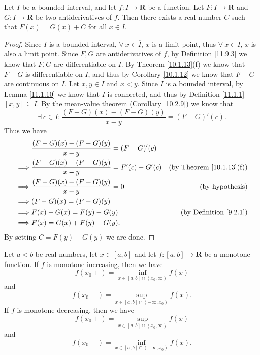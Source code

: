 \begin{lemma}\label{11.9.5}
    Let \(I\) be a bounded interval, and let \(f : I \to \mathbf{R}\) be a function.
    Let \(F : I \to \mathbf{R}\) and \(G : I \to \mathbf{R}\) be two antiderivatives of \(f\).
    Then there exists a real number \(C\) such that \(F(x) = G(x) + C\) for all \(x \in I\).
\end{lemma}

\begin{proof}
    Since \(I\) is a bounded interval, \(\forall\ x \in \overline{I}\), \(x\) is a limit point, thus \(\forall\ x \in I\), \(x\) is also a limit point.
    Since \(F, G\) are antiderivatives of \(f\), by Definition \ref{11.9.3} we know that \(F, G\) are differentiable on \(I\).
    By Theorem \ref{10.1.13}(f) we know that \(F - G\) is differentiable on \(I\), and thus by Corollary \ref{10.1.12} we know that \(F - G\) are continuous on \(I\).
    Let \(x, y \in I\) and \(x < y\).
    Since \(I\) is a bounded interval, by Lemma \ref{11.1.10} we know that \(I\) is connected, and thus by Definition \ref{11.1.1} \([x, y] \subseteq I\).
    By the mean-value theorem (Corollary \ref{10.2.9}) we know that
    \[
        \exists\ c \in I : \frac{(F - G)(x) - (F - G)(y)}{x - y} = (F - G)'(c).
    \]
    Thus we have
    \begin{align*}
                 & \frac{(F - G)(x) - (F - G)(y)}{x - y} = (F - G)'(c)                                          \\
        \implies & \frac{(F - G)(x) - (F - G)(y)}{x - y} = F'(c) - G'(c) & \text{(by Theorem \ref{10.1.13}(f))} \\
        \implies & \frac{(F - G)(x) - (F - G)(y)}{x - y} = 0             & \text{(by hypothesis)}               \\
        \implies & (F - G)(x) = (F - G)(y)                                                                      \\
        \implies & F(x) - G(x) = F(y) - G(y)                             & \text{(by Definition \ref{9.2.1})}   \\
        \implies & F(x) = G(x) + F(y) - G(y).
    \end{align*}
    By setting \(C = F(y) - G(y)\) we are done.
\end{proof}

\begin{proposition}\label{11.9.6}
    Let \(a < b\) be real numbers, let \(x \in [a, b]\) and let \(f : [a, b] \to \mathbf{R}\) be a monotone function.
    If \(f\) is monotone increasing, then we have
    \[
        f(x_0+) = \inf_{x \in [a, b] \cap (x_0, \infty)} f(x)
    \]
    and
    \[
        f(x_0-) = \sup_{x \in [a, b] \cap (-\infty, x_0)} f(x).
    \]
    If \(f\) is monotone decreasing, then we have
    \[
        f(x_0+) = \sup_{x \in [a, b] \cap (x_0, \infty)} f(x)
    \]
    and
    \[
        f(x_0-) = \inf_{x \in [a, b] \cap (-\infty, x_0)} f(x).
    \]
\end{proposition}

